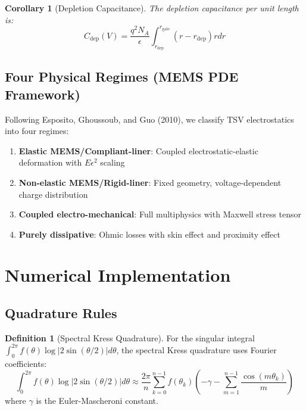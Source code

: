 \documentclass[12pt]{article}
\newtheorem{corollary}{Corollary}
\theoremstyle{definition}
\newtheorem{definition}{Definition}
\begin{document}
\begin{corollary}[Depletion Capacitance]
The depletion capacitance per unit length is:
\begin{equation}
C_{\text{dep}}(V) = \frac{q^2 N_A}{\epsilon} \int_{r_{\text{dep}}}^{r_{\text{gate}}} (r - r_{\text{dep}}) r dr
\end{equation}
\end{corollary}

\subsection{Four Physical Regimes (MEMS PDE Framework)}

Following Esposito, Ghoussoub, and Guo (2010), we classify TSV electrostatics into four regimes:

\begin{enumerate}
\item \textbf{Elastic MEMS/Compliant-liner}: Coupled electrostatic-elastic deformation with $E \epsilon^2$ scaling
\item \textbf{Non-elastic MEMS/Rigid-liner}: Fixed geometry, voltage-dependent charge distribution
\item \textbf{Coupled electro-mechanical}: Full multiphysics with Maxwell stress tensor
\item \textbf{Purely dissipative}: Ohmic losses with skin effect and proximity effect
\end{enumerate}

\section{Numerical Implementation}

\subsection{Quadrature Rules}

\begin{definition}[Spectral Kress Quadrature]
For the singular integral $\int_0^{2\pi} f(\theta) \log |2 \sin(\theta/2)| d\theta$, the spectral Kress quadrature uses Fourier coefficients:
\begin{equation}
\int_0^{2\pi} f(\theta) \log |2 \sin(\theta/2)| d\theta \approx \frac{2\pi}{n} \sum_{k=0}^{n-1} f(\theta_k) \left(-\gamma - \sum_{m=1}^{n-1} \frac{\cos(m \theta_k)}{m}\right)
\end{equation}
where $\gamma$ is the Euler-Mascheroni constant.
\end{definition}
\end{document}

